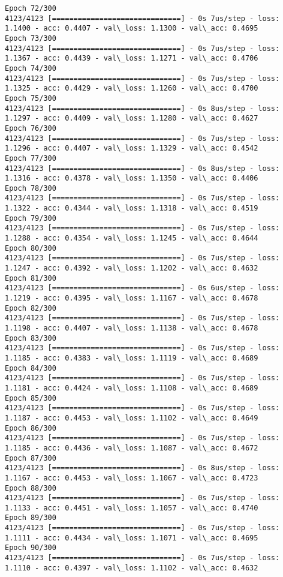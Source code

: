 \documentclass[11pt]{article}
\begin{document}
\begin{Verbatim}[commandchars=\\\{\}]
Epoch 72/300
4123/4123 [==============================] - 0s 7us/step - loss: 1.1400 - acc: 0.4407 - val\_loss: 1.1300 - val\_acc: 0.4695
Epoch 73/300
4123/4123 [==============================] - 0s 7us/step - loss: 1.1367 - acc: 0.4439 - val\_loss: 1.1271 - val\_acc: 0.4706
Epoch 74/300
4123/4123 [==============================] - 0s 7us/step - loss: 1.1325 - acc: 0.4429 - val\_loss: 1.1260 - val\_acc: 0.4700
Epoch 75/300
4123/4123 [==============================] - 0s 8us/step - loss: 1.1297 - acc: 0.4409 - val\_loss: 1.1280 - val\_acc: 0.4627
Epoch 76/300
4123/4123 [==============================] - 0s 7us/step - loss: 1.1296 - acc: 0.4407 - val\_loss: 1.1329 - val\_acc: 0.4542
Epoch 77/300
4123/4123 [==============================] - 0s 8us/step - loss: 1.1316 - acc: 0.4378 - val\_loss: 1.1350 - val\_acc: 0.4406
Epoch 78/300
4123/4123 [==============================] - 0s 7us/step - loss: 1.1322 - acc: 0.4344 - val\_loss: 1.1318 - val\_acc: 0.4519
Epoch 79/300
4123/4123 [==============================] - 0s 7us/step - loss: 1.1288 - acc: 0.4354 - val\_loss: 1.1245 - val\_acc: 0.4644
Epoch 80/300
4123/4123 [==============================] - 0s 7us/step - loss: 1.1247 - acc: 0.4392 - val\_loss: 1.1202 - val\_acc: 0.4632
Epoch 81/300
4123/4123 [==============================] - 0s 6us/step - loss: 1.1219 - acc: 0.4395 - val\_loss: 1.1167 - val\_acc: 0.4678
Epoch 82/300
4123/4123 [==============================] - 0s 7us/step - loss: 1.1198 - acc: 0.4407 - val\_loss: 1.1138 - val\_acc: 0.4678
Epoch 83/300
4123/4123 [==============================] - 0s 7us/step - loss: 1.1185 - acc: 0.4383 - val\_loss: 1.1119 - val\_acc: 0.4689
Epoch 84/300
4123/4123 [==============================] - 0s 7us/step - loss: 1.1181 - acc: 0.4424 - val\_loss: 1.1108 - val\_acc: 0.4689
Epoch 85/300
4123/4123 [==============================] - 0s 7us/step - loss: 1.1187 - acc: 0.4453 - val\_loss: 1.1102 - val\_acc: 0.4649
Epoch 86/300
4123/4123 [==============================] - 0s 7us/step - loss: 1.1185 - acc: 0.4436 - val\_loss: 1.1087 - val\_acc: 0.4672
Epoch 87/300
4123/4123 [==============================] - 0s 8us/step - loss: 1.1167 - acc: 0.4453 - val\_loss: 1.1067 - val\_acc: 0.4723
Epoch 88/300
4123/4123 [==============================] - 0s 7us/step - loss: 1.1133 - acc: 0.4451 - val\_loss: 1.1057 - val\_acc: 0.4740
Epoch 89/300
4123/4123 [==============================] - 0s 7us/step - loss: 1.1111 - acc: 0.4434 - val\_loss: 1.1071 - val\_acc: 0.4695
Epoch 90/300
4123/4123 [==============================] - 0s 7us/step - loss: 1.1110 - acc: 0.4397 - val\_loss: 1.1102 - val\_acc: 0.4632

\end{Verbatim}
\end{document}
